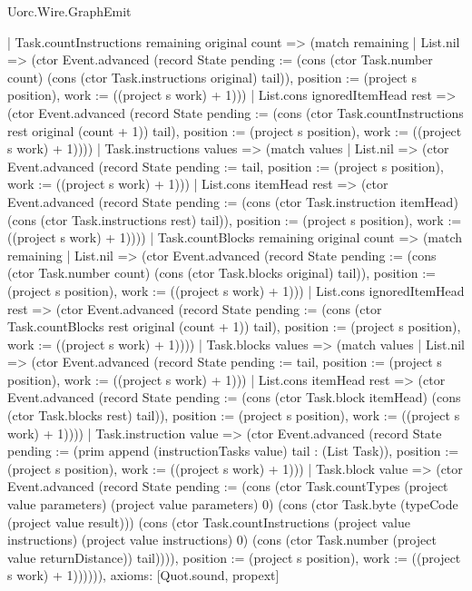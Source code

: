 \begin{lexlean}{Uorc.Wire.GraphEmit}
\begin{semanticmodule}
{      | Task.countInstructions remaining original count => (match remaining
        | List.nil => (ctor Event.advanced (record State {pending := (cons (ctor Task.number count) (cons (ctor Task.instructions original) tail)), position := (project s position), work := ((project s work) + 1)}))
        | List.cons ignoredItemHead rest => (ctor Event.advanced (record State {pending := (cons (ctor Task.countInstructions rest original (count + 1)) tail), position := (project s position), work := ((project s work) + 1)})))
      | Task.instructions values => (match values
        | List.nil => (ctor Event.advanced (record State {pending := tail, position := (project s position), work := ((project s work) + 1)}))
        | List.cons itemHead rest => (ctor Event.advanced (record State {pending := (cons (ctor Task.instruction itemHead) (cons (ctor Task.instructions rest) tail)), position := (project s position), work := ((project s work) + 1)})))
      | Task.countBlocks remaining original count => (match remaining
        | List.nil => (ctor Event.advanced (record State {pending := (cons (ctor Task.number count) (cons (ctor Task.blocks original) tail)), position := (project s position), work := ((project s work) + 1)}))
        | List.cons ignoredItemHead rest => (ctor Event.advanced (record State {pending := (cons (ctor Task.countBlocks rest original (count + 1)) tail), position := (project s position), work := ((project s work) + 1)})))
      | Task.blocks values => (match values
        | List.nil => (ctor Event.advanced (record State {pending := tail, position := (project s position), work := ((project s work) + 1)}))
        | List.cons itemHead rest => (ctor Event.advanced (record State {pending := (cons (ctor Task.block itemHead) (cons (ctor Task.blocks rest) tail)), position := (project s position), work := ((project s work) + 1)})))
      | Task.instruction value => (ctor Event.advanced (record State {pending := (prim append (instructionTasks value) tail : (List Task)), position := (project s position), work := ((project s work) + 1)}))
      | Task.block value => (ctor Event.advanced (record State {pending := (cons (ctor Task.countTypes (project value parameters) (project value parameters) 0) (cons (ctor Task.byte (typeCode (project value result))) (cons (ctor Task.countInstructions (project value instructions) (project value instructions) 0) (cons (ctor Task.number (project value returnDistance)) tail)))), position := (project s position), work := ((project s work) + 1)}))))),
  axioms: [Quot.sound, propext]
}


\end{semanticmodule}
\end{lexlean}

